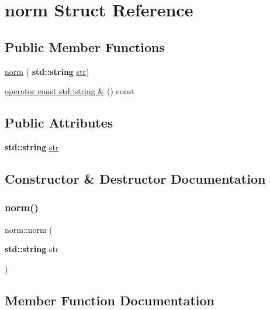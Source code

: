 \hypertarget{structnorm}{}\section{norm Struct Reference}
\label{structnorm}
\subsection*{Public Member Functions}
\begin{DoxyCompactItemize}
\item 
\hyperlink{structnorm_a68ee586990f39360a9705a99e7a22aa6}{norm} (\textbf{ std\+::string} \hyperlink{structnorm_a036899312aa207abbb8bb5f1aba8c780}{str})
\item 
\hyperlink{structnorm_a2a983a568299db9bd0a71490e14d97da}{operator const std\+::string \&} () const
\end{DoxyCompactItemize}
\subsection*{Public Attributes}
\begin{DoxyCompactItemize}
\item 
\textbf{ std\+::string} \hyperlink{structnorm_a036899312aa207abbb8bb5f1aba8c780}{str}
\end{DoxyCompactItemize}


\subsection{Constructor \& Destructor Documentation}
\mbox{\label{structnorm_a68ee586990f39360a9705a99e7a22aa6}} 
\subsubsection{\texorpdfstring{norm()}{norm()}}
{\footnotesize\ttfamily norm\+::norm (\begin{DoxyParamCaption}\item[{\textbf{ std\+::string}}]{str }\end{DoxyParamCaption})\hspace{0.3cm}{\ttfamily [inline]}}



\subsection{Member Function Documentation}
\mbox{\label{structnorm_a2a983a568299db9bd0a71490e14d97da}} 
